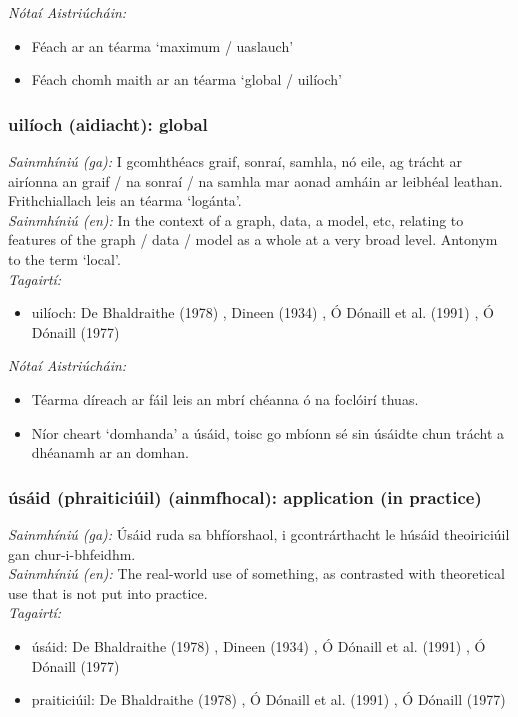  \noindent \textit{Nótaí Aistriúcháin:}
\begin{itemize}
	\item Féach ar an téarma `maximum / uaslauch'
	\item Féach chomh maith ar an téarma `global / uilíoch'
\end{itemize}


\subsubsection*{uilíoch (aidiacht): global}
 \noindent \textit{Sainmhíniú (ga):} I gcomhthéacs graif, sonraí, samhla, nó eile, ag trácht ar airíonna an graif / na sonraí / na samhla mar aonad amháin ar leibhéal leathan. Frithchiallach leis an téarma `logánta'.
\\
 \noindent \textit{Sainmhíniú (en):} In the context of a graph, data, a model, etc, relating to features of the graph / data / model as a whole at a very broad level. Antonym to the term `local'.
\\
 \noindent \textit{Tagairtí:}
\begin{itemize}
	\item uilíoch: De Bhaldraithe (1978) \cite{de-bhaldraithe}, Dineen (1934) \cite{dineen}, Ó Dónaill et al. (1991) \cite{focloir-beag}, Ó Dónaill (1977) \cite{odonaill}
\end{itemize}

 \noindent \textit{Nótaí Aistriúcháin:}
\begin{itemize}
	\item Téarma díreach ar fáil leis an mbrí chéanna ó na foclóirí thuas.
	\item Níor cheart `domhanda' a úsáid, toisc go mbíonn sé sin úsáidte chun trácht a dhéanamh ar an domhan.
\end{itemize}


\subsubsection*{úsáid (phraiticiúil) (ainmfhocal): application (in practice)}
 \noindent \textit{Sainmhíniú (ga):} Úsáid ruda sa bhfíorshaol, i gcontrárthacht le húsáid theoiriciúil gan chur-i-bhfeidhm.
\\
 \noindent \textit{Sainmhíniú (en):} The real-world use of something, as contrasted with theoretical use that is not put into practice.
\\
 \noindent \textit{Tagairtí:}
\begin{itemize}
	\item úsáid: De Bhaldraithe (1978) \cite{de-bhaldraithe}, Dineen (1934) \cite{dineen}, Ó Dónaill et al. (1991) \cite{focloir-beag}, Ó Dónaill (1977) \cite{odonaill}
	\item praiticiúil: De Bhaldraithe (1978) \cite{de-bhaldraithe}, Ó Dónaill et al. (1991) \cite{focloir-beag}, Ó Dónaill (1977) \cite{odonaill}
\end{itemize}

